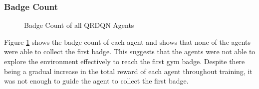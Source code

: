\subsubsection{Badge Count}

\begin{figure}[H]
    \centering
    \caption{Badge Count of all QRDQN Agents}
    \label{fig:QRDQN_badge_count}
\end{figure}

Figure \ref{fig:QRDQN_badge_count} shows the badge count of each agent and shows that none of the agents were able to collect the first badge. This suggests that the agents were not able to explore the environment effectively to reach the first gym badge. Despite there being a gradual increase in the total reward of each agent throughout training, it was not enough to guide the agent to collect the first badge. 

